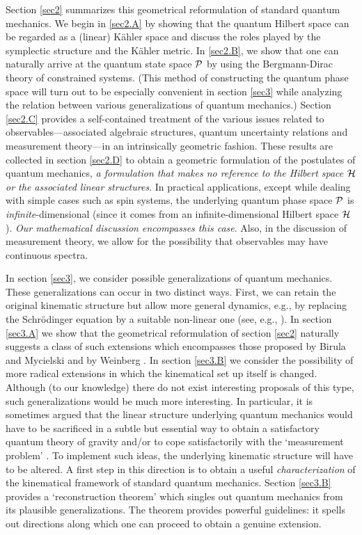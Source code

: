 \documentclass[12pt,aps,eqsecnum,tighten]{revtex4-2}
\def\H{{\cal H}}
\def\P{{\cal P}}
\begin{document}
Section \ref{sec2} summarizes this geometrical reformulation of
standard quantum mechanics. We begin in \ref{sec2.A} by showing that
the quantum Hilbert space can be regarded as a (linear) K\"ahler space
and discuss the roles played by the symplectic structure and the
K\"ahler metric. In \ref{sec2.B}, we show that one can naturally
arrive at the quantum state space ${\cal P}$ by using the
Bergmann-Dirac theory of constrained systems. (This method of
constructing the quantum phase space will turn out to be especially
convenient in section \ref{sec3} while analyzing the relation between
various generalizations of quantum mechanics.) Section \ref{sec2.C}
provides a self-contained treatment of the various issues related to
observables---associated algebraic structures, quantum uncertainty
relations and measurement theory---in an intrinsically geometric
fashion. These results are collected in section \ref{sec2.D} to obtain
a geometric formulation of the postulates of quantum mechanics, {\it a
formulation that makes no reference to the Hilbert space $\H$ or the
associated linear structures}. In practical applications, except while
dealing with simple cases such as spin systems, the underlying quantum
phase space $\P$ is {\it infinite}-dimensional (since it comes from an
infinite-dimensional Hilbert space $\H$). {\it Our mathematical
discussion encompasses this case}. Also, in the discussion of
measurement theory, we allow for the possibility that observables may
have continuous spectra.

In section \ref{sec3}, we consider possible generalizations of quantum
mechanics. These generalizations can occur in two distinct
ways. First, we can retain the original kinematic structure but allow
more general dynamics, e.g., by replacing the Schr\"odinger equation
by a suitable non-linear one (see, e.g., \cite{birula}).  In section
\ref{sec3.A} we show that the geometrical reformulation of section
\ref{sec2} naturally suggests a class of such extensions which
encompasses those proposed by Birula and Mycielski \cite{birula} and
by Weinberg \cite{weinberg}. In section \ref{sec3.B} we consider the
possibility of more radical extensions in which the kinematical set up
itself is changed.  Although (to our knowledge) there do not exist
interesting proposals of this type, such generalizations would be much
more interesting.  In particular, it is sometimes argued that the
linear structure underlying quantum mechanics would have to be
sacrificed in a subtle but essential way to obtain a satisfactory
quantum theory of gravity and/or to cope satisfactorily with the
`measurement problem' \cite{rp1}. To implement such ideas, the
underlying kinematic structure will have to be altered.  A first step
in this direction is to obtain a useful {\it characterization} of the
kinematical framework of standard quantum mechanics. Section
\ref{sec3.B} provides a `reconstruction theorem' which singles out
quantum mechanics from its plausible generalizations. The theorem
provides powerful guidelines: it spells out directions along which one
can proceed to obtain a genuine extension.
\end{document}
